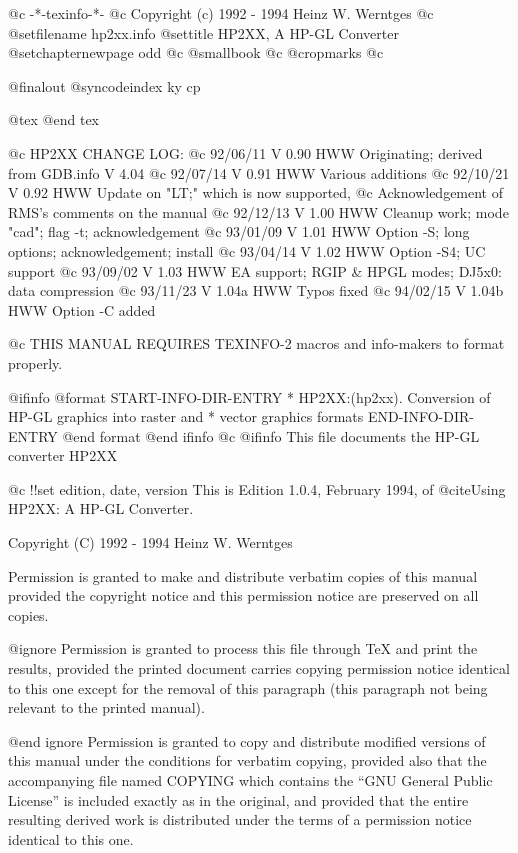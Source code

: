      @c -*-texinfo-*-
@c Copyright (c) 1992 - 1994  Heinz W. Werntges
@c %
@setfilename hp2xx.info
@settitle HP2XX, A HP-GL Converter
@setchapternewpage odd
@c @smallbook
@c @cropmarks
@c %

@finalout
@syncodeindex ky cp

@tex
\xdef\manvers{$Revision: 1.0.4 $}  %
@end tex

@c HP2XX CHANGE LOG:
@c 92/06/11  V 0.90  HWW  Originating; derived from GDB.info V 4.04
@c 92/07/14  V 0.91  HWW  Various additions
@c 92/10/21  V 0.92  HWW  Update on "LT;" which is now supported,
@c                        Acknowledgement of RMS's comments on the manual
@c 92/12/13  V 1.00  HWW  Cleanup work; mode "cad"; flag -t; acknowledgement
@c 93/01/09  V 1.01  HWW  Option -S; long options; acknowledgement; install
@c 93/04/14  V 1.02  HWW  Option -S4; UC support
@c 93/09/02  V 1.03  HWW  EA support; RGIP & HPGL modes; DJ5x0: data compression
@c 93/11/23  V 1.04a HWW  Typos fixed
@c 94/02/15  V 1.04b HWW  Option -C added

@c THIS MANUAL REQUIRES TEXINFO-2 macros and info-makers to format properly.

@ifinfo
@format
START-INFO-DIR-ENTRY
* HP2XX:(hp2xx).  Conversion of HP-GL graphics into raster and
*                 vector graphics formats
END-INFO-DIR-ENTRY
@end format
@end ifinfo
@c
@ifinfo
This file documents the HP-GL converter HP2XX

@c !!set edition, date, version
This is Edition 1.0.4, February 1994,
of @cite{Using HP2XX: A HP-GL Converter}.

Copyright (C) 1992 - 1994 Heinz W. Werntges

Permission is granted to make and distribute verbatim copies of
this manual provided the copyright notice and this permission notice
are preserved on all copies.

@ignore
Permission is granted to process this file through TeX and print the
results, provided the printed document carries copying permission
notice identical to this one except for the removal of this paragraph
(this paragraph not being relevant to the printed manual).

@end ignore
Permission is granted to copy and distribute modified versions of this
manual under the conditions for verbatim copying, provided also that the
accompanying file named COPYING which contains the ``GNU General Public
License'' is included exactly as in the original, and provided that the
entire resulting derived work is distributed under the terms of a permission
notice identical to this one.

